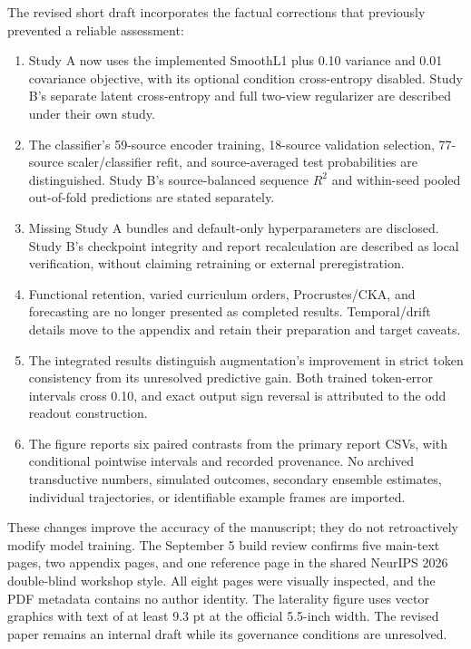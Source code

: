 \documentclass[11pt,letterpaper]{article}
\providecommand{\tightlist}{\setlength{\itemsep}{0pt}\setlength{\parskip}{0pt}}
\begin{document}
The revised short draft incorporates the factual corrections that
previously prevented a reliable assessment:

\begin{enumerate}
\def\labelenumi{\arabic{enumi}.}
\tightlist
\item
  Study A now uses the implemented SmoothL1 plus 0.10 variance and 0.01
  covariance objective, with its optional condition cross-entropy
  disabled. Study B's separate latent cross-entropy and full two-view
  regularizer are described under their own study.
\item
  The classifier's 59-source encoder training, 18-source validation
  selection, 77-source scaler/classifier refit, and source-averaged test
  probabilities are distinguished. Study B's source-balanced sequence
  \(R^2\) and within-seed pooled out-of-fold predictions are stated
  separately.
\item
  Missing Study A bundles and default-only hyperparameters are
  disclosed. Study B's checkpoint integrity and report recalculation are
  described as local verification, without claiming retraining or
  external preregistration.
\item
  Functional retention, varied curriculum orders, Procrustes/CKA, and
  forecasting are no longer presented as completed results.
  Temporal/drift details move to the appendix and retain their
  preparation and target caveats.
\item
  The integrated results distinguish augmentation's improvement in
  strict token consistency from its unresolved predictive gain. Both
  trained token-error intervals cross 0.10, and exact output sign
  reversal is attributed to the odd readout construction.
\item
  The figure reports six paired contrasts from the primary report CSVs,
  with conditional pointwise intervals and recorded provenance. No
  archived transductive numbers, simulated outcomes, secondary ensemble
  estimates, individual trajectories, or identifiable example frames are
  imported.
\end{enumerate}

These changes improve the accuracy of the manuscript; they do not
retroactively modify model training. The September 5 build review
confirms five main-text pages, two appendix pages, and one reference
page in the shared NeurIPS 2026 double-blind workshop style. All eight
pages were visually inspected, and the PDF metadata contains no author
identity. The laterality figure uses vector graphics with text of at
least 9.3 pt at the official 5.5-inch width. The revised paper remains
an internal draft while its governance conditions are unresolved.
\end{document}
